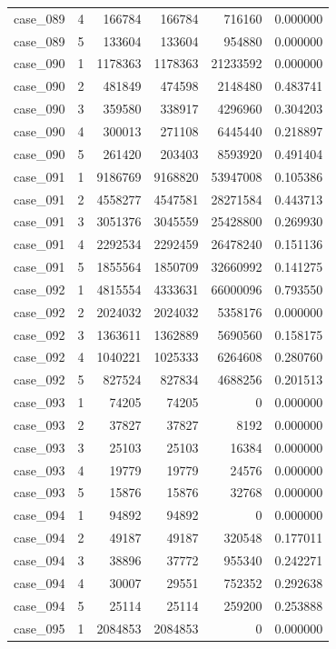 \begin{longtable}{lrrrrr}
case\_089 & 4 & 166784 & 166784 & 716160 & 0.000000 \\
case\_089 & 5 & 133604 & 133604 & 954880 & 0.000000 \\
case\_090 & 1 & 1178363 & 1178363 & 21233592 & 0.000000 \\
case\_090 & 2 & 481849 & 474598 & 2148480 & 0.483741 \\
case\_090 & 3 & 359580 & 338917 & 4296960 & 0.304203 \\
case\_090 & 4 & 300013 & 271108 & 6445440 & 0.218897 \\
case\_090 & 5 & 261420 & 203403 & 8593920 & 0.491404 \\
case\_091 & 1 & 9186769 & 9168820 & 53947008 & 0.105386 \\
case\_091 & 2 & 4558277 & 4547581 & 28271584 & 0.443713 \\
case\_091 & 3 & 3051376 & 3045559 & 25428800 & 0.269930 \\
case\_091 & 4 & 2292534 & 2292459 & 26478240 & 0.151136 \\
case\_091 & 5 & 1855564 & 1850709 & 32660992 & 0.141275 \\
case\_092 & 1 & 4815554 & 4333631 & 66000096 & 0.793550 \\
case\_092 & 2 & 2024032 & 2024032 & 5358176 & 0.000000 \\
case\_092 & 3 & 1363611 & 1362889 & 5690560 & 0.158175 \\
case\_092 & 4 & 1040221 & 1025333 & 6264608 & 0.280760 \\
case\_092 & 5 & 827524 & 827834 & 4688256 & 0.201513 \\
case\_093 & 1 & 74205 & 74205 & 0 & 0.000000 \\
case\_093 & 2 & 37827 & 37827 & 8192 & 0.000000 \\
case\_093 & 3 & 25103 & 25103 & 16384 & 0.000000 \\
case\_093 & 4 & 19779 & 19779 & 24576 & 0.000000 \\
case\_093 & 5 & 15876 & 15876 & 32768 & 0.000000 \\
case\_094 & 1 & 94892 & 94892 & 0 & 0.000000 \\
case\_094 & 2 & 49187 & 49187 & 320548 & 0.177011 \\
case\_094 & 3 & 38896 & 37772 & 955340 & 0.242271 \\
case\_094 & 4 & 30007 & 29551 & 752352 & 0.292638 \\
case\_094 & 5 & 25114 & 25114 & 259200 & 0.253888 \\
case\_095 & 1 & 2084853 & 2084853 & 0 & 0.000000 \\

\end{longtable}
